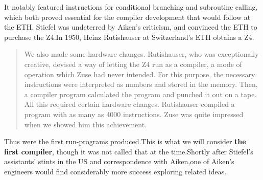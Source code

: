 It notably featured instructions for conditional branching and subroutine
calling, which both proved essential for the compiler development that would
follow at the ETH. Stiefel was undeterred by Aiken's criticism, and convinced
the ETH to purchase the Z4.In 1950, Heinz Rutishauser at Switzerland's ETH
obtains a Z4.
\begin{quotation}
  We also made some hardware changes. Rutishauser, who was exceptionally
  creative, devised a way of letting the Z4 run as a compiler, a mode
  of operation
  which Zuse had never intended. For this purpose, the necessary
  instructions were
  interpreted as numbers and stored in the memory. Then, a compiler
  program calculated the program and punched it out on a tape. All this required
  certain hardware changes. Rutishauser compiled a program with as many as 4000
  instructions. Zuse was quite impressed when we showed him this achievement.
  \cite{konrad-zuses-z4-2000}
\end{quotation}
Thus were the first run-programs produced.This is what we will
consider \textbf{the first compiler}, though it was not called that
at the time.Shortly after Stiefel's assistants' stints in the US and
correspondence with Aiken,one of Aiken's engineers would find
considerably more success exploring related ideas.

